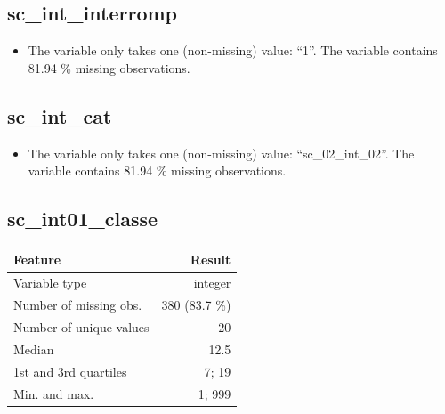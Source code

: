 \documentclass[
  letterpaper,
  DIV=11,
  numbers=noendperiod]{scrartcl}
\providecommand{\tightlist}{%
  \setlength{\itemsep}{0pt}\setlength{\parskip}{0pt}}
\begin{document}
\subsection{sc\_int\_interromp}\label{sc_int_interromp}

\begin{itemize}
\tightlist
\item
  The variable only takes one (non-missing) value: ``1''. The variable
  contains 81.94 \% missing observations.
\end{itemize}

\fullline

\subsection{sc\_int\_cat}\label{sc_int_cat}

\begin{itemize}
\tightlist
\item
  The variable only takes one (non-missing) value: ``sc\_02\_int\_02''.
  The variable contains 81.94 \% missing observations.
\end{itemize}

\fullline

\subsection{sc\_int01\_classe}\label{sc_int01_classe}

\bminione

\begin{longtable}[]{@{}lr@{}}
\toprule\noalign{}
Feature & Result \\
\midrule\noalign{}
\endhead
\bottomrule\noalign{}
\endlastfoot
Variable type & integer \\
Number of missing obs. & 380 (83.7 \%) \\
Number of unique values & 20 \\
Median & 12.5 \\
1st and 3rd quartiles & 7; 19 \\
Min. and max. & 1; 999 \\
\end{longtable}

\emini
\bminitwo
\end{document}
